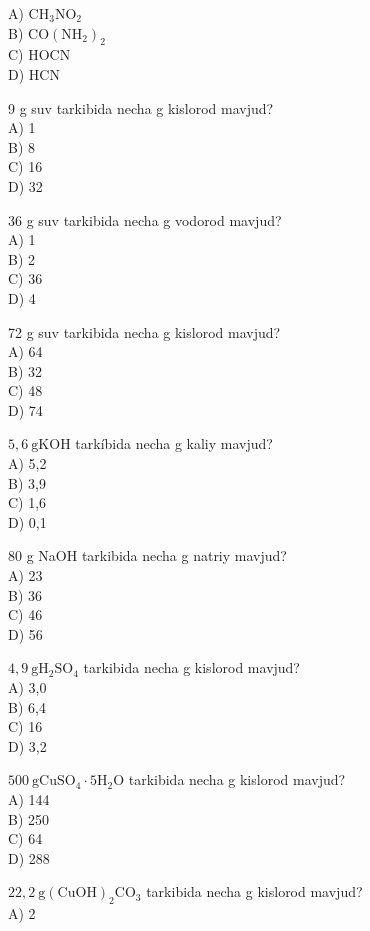 A) $\mathrm{CH}_{3} \mathrm{NO}_{2}$\\
B) $\mathrm{CO}\left(\mathrm{NH}_{2}\right)_{2}$\\
C) HOCN\\
D) HCN
  \item 9 g suv tarkibida necha g kislorod mavjud?\\
A) 1\\
B) 8\\
C) 16\\
D) 32\\
  \item 36 g suv tarkibida necha g vodorod mavjud?\\
A) 1\\
B) 2\\
C) 36\\
D) 4
  \item 72 g suv tarkibida necha g kislorod mavjud?\\
A) 64\\
B) 32\\
C) 48\\
D) 74
  \item $5,6 \mathrm{~g} \mathrm{KOH}$ tarkíbida necha g kaliy mavjud?\\
A) 5,2\\
B) 3,9\\
C) 1,6\\
D) 0,1
  \item 80 g NaOH tarkibida necha g natriy mavjud?\\
A) 23\\
B) 36\\
C) 46\\
D) 56
  \item $4,9 \mathrm{~g} \mathrm{H}_{2} \mathrm{SO}_{4}$ tarkibida necha g kislorod mavjud?\\
A) 3,0\\
B) 6,4\\
C) 16\\
D) 3,2
  \item $500 \mathrm{~g} \mathrm{CuSO}{ }_{4} \cdot 5 \mathrm{H}_{2} \mathrm{O}$ tarkibida necha g kislorod mavjud?\\
A) 144\\
B) 250\\
C) 64\\
D) 288
  \item $22,2 \mathrm{~g}(\mathrm{CuOH})_{2} \mathrm{CO}_{3}$ tarkibida necha g kislorod mavjud?\\
A) 2\\
